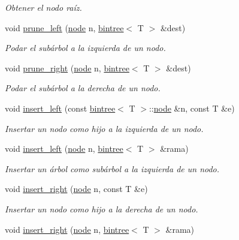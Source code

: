 \begin{DoxyCompactItemize}
\begin{DoxyCompactList}\small\item\em Obtener el nodo raíz. \end{DoxyCompactList}\item 
void \hyperlink{classbintree_a74b4b7570b9b574391742f892520562b}{prune\+\_\+left} (\hyperlink{classbintree_1_1node}{node} n, \hyperlink{classbintree}{bintree}$<$ T $>$ \&dest)
\begin{DoxyCompactList}\small\item\em Podar el subárbol a la izquierda de un nodo. \end{DoxyCompactList}\item 
void \hyperlink{classbintree_ae468b92dd3eb70818ffbd969ff34d811}{prune\+\_\+right} (\hyperlink{classbintree_1_1node}{node} n, \hyperlink{classbintree}{bintree}$<$ T $>$ \&dest)
\begin{DoxyCompactList}\small\item\em Podar el subárbol a la derecha de un nodo. \end{DoxyCompactList}\item 
void \hyperlink{classbintree_a49d681962f17c3ef0b63ddd529d15e6a}{insert\+\_\+left} (const \hyperlink{classbintree}{bintree}$<$ T $>$\+::\hyperlink{classbintree_1_1node}{node} \&n, const T \&e)
\begin{DoxyCompactList}\small\item\em Insertar un nodo como hijo a la izquierda de un nodo. \end{DoxyCompactList}\item 
void \hyperlink{classbintree_a17611b995af1d5421197d155e75e683f}{insert\+\_\+left} (\hyperlink{classbintree_1_1node}{node} n, \hyperlink{classbintree}{bintree}$<$ T $>$ \&rama)
\begin{DoxyCompactList}\small\item\em Insertar un árbol como subárbol a la izquierda de un nodo. \end{DoxyCompactList}\item 
void \hyperlink{classbintree_a8f25464ce656370a6ab5d56ac56a3b5e}{insert\+\_\+right} (\hyperlink{classbintree_1_1node}{node} n, const T \&e)
\begin{DoxyCompactList}\small\item\em Insertar un nodo como hijo a la derecha de un nodo. \end{DoxyCompactList}\item 
void \hyperlink{classbintree_a01c798112c64624e3e90ed027bfd76e1}{insert\+\_\+right} (\hyperlink{classbintree_1_1node}{node} n, \hyperlink{classbintree}{bintree}$<$ T $>$ \&rama)

\end{DoxyCompactItemize}
